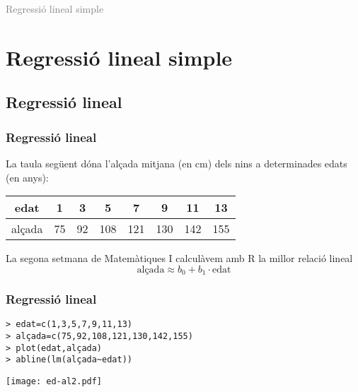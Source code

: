 \documentclass[12pt,t]{beamer}
\title[\red{Matemàtiques II}]{}
\author[]{}
\date{}
\newcommand{\gray}[1]{\textcolor{gray}{#1}}
\theoremstyle{plain}
\theoremstyle{definition}
\begin{document}
\beamertemplatedotitem

\lstset{breaklines=true}
\lstset{basicstyle=\ttfamily}


\begin{frame}
\vfill
\begin{center}
\gray{\LARGE Regressió lineal simple}
\end{center}
\vfill
\end{frame}


\section{Regressió lineal simple}
\subsection{Regressió lineal}

\begin{frame}
\frametitle{Regressió lineal}

La taula següent dóna l'alçada mitjana (en cm) dels nins a determinades edats (en anys):
\begin{center}
\begin{tabular}{c|ccccccc}
\hline
edat & 1 & 3 & 5 & 7 & 9 & 11 & 13\\
\hline
alçada & 75 & 92 & 108 & 121 & 130 & 142 & 155\\
\hline
\end{tabular}
\end{center}
La segona setmana de Matemàtiques I calculàvem amb R la millor relació lineal
$$
\mbox{alçada}\approx b_0+b_1\cdot\mbox{edat}
$$ 
\end{frame}



\begin{frame}[fragile]
\frametitle{Regressió lineal}
\vspace*{-2ex}

\begin{verbatim}
> edat=c(1,3,5,7,9,11,13)
> alçada=c(75,92,108,121,130,142,155)
> plot(edat,alçada)
> abline(lm(alçada~edat))
\end{verbatim}
\vspace*{-4ex}

\begin{center}
\texttt{[image: ed-al2.pdf]}
\end{center}
\end{frame}
\end{document}
